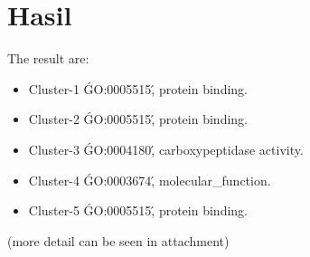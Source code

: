 \section{Hasil}

The result are:
\begin{itemize}
	\item Cluster-1 \'GO:0005515\', protein binding.
	\item Cluster-2 \'GO:0005515\', protein binding.
	\item Cluster-3 \'GO:0004180\', carboxypeptidase activity.
	\item Cluster-4 \'GO:0003674\', molecular\_function.
	\item Cluster-5 \'GO:0005515\', protein binding.
\end{itemize}

(more detail can be seen in attachment)

